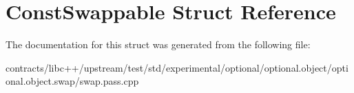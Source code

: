 \hypertarget{struct_const_swappable}{}\section{Const\+Swappable Struct Reference}
\label{struct_const_swappable}


The documentation for this struct was generated from the following file\+:\begin{DoxyCompactItemize}
\item 
contracts/libc++/upstream/test/std/experimental/optional/optional.\+object/optional.\+object.\+swap/swap.\+pass.\+cpp\end{DoxyCompactItemize}
